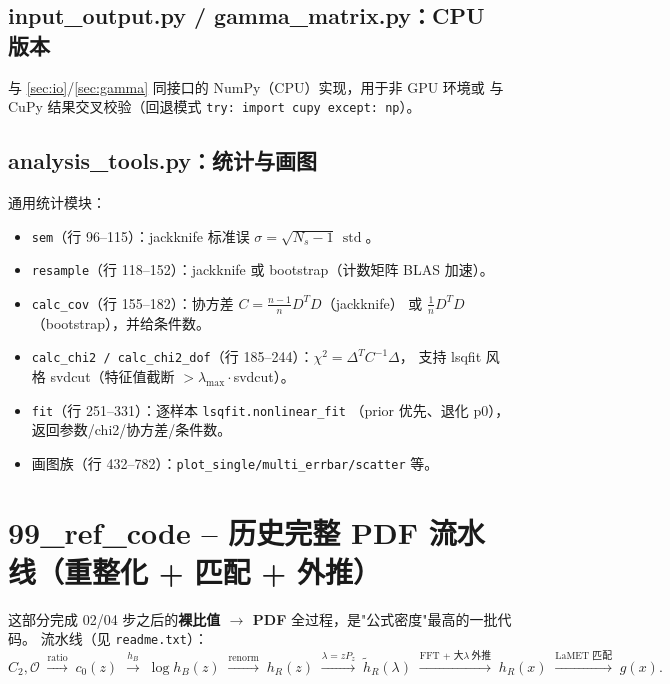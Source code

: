 \documentclass[UTF8,11pt]{ctexart}
\begin{document}
\subsection{input\_output.py / gamma\_matrix.py：CPU 版本}
\label{sec:io_cpu}

与 \ref{sec:io}/\ref{sec:gamma} 同接口的 NumPy（CPU）实现，用于非 GPU 环境或
与 CuPy 结果交叉校验（回退模式 \texttt{try: import cupy except: np}）。

\subsection{analysis\_tools.py：统计与画图}
\label{sec:analysis_tools}

通用统计模块：
\begin{itemize}
  \item \texttt{sem}（行 96--115）：jackknife 标准误 $\sigma=\sqrt{N_s-1}\,\operatorname{std}$。
  \item \texttt{resample}（行 118--152）：jackknife 或 bootstrap（计数矩阵 BLAS 加速）。
  \item \texttt{calc\_cov}（行 155--182）：协方差 $C=\frac{n-1}{n}D^T D$（jackknife）
  或 $\frac1n D^T D$（bootstrap），并给条件数。
  \item \texttt{calc\_chi2 / calc\_chi2\_dof}（行 185--244）：$\chi^2=\Delta^T C^{-1}\Delta$，
  支持 lsqfit 风格 svdcut（特征值截断 $> \lambda_{\max}\cdot$svdcut）。
  \item \texttt{fit}（行 251--331）：逐样本 \texttt{lsqfit.nonlinear\_fit}
  （prior 优先、退化 p0），返回参数/chi2/协方差/条件数。
  \item 画图族（行 432--782）：\texttt{plot\_single/multi\_errbar/scatter} 等。
\end{itemize}

\section{99\_ref\_code -- 历史完整 PDF 流水线（重整化 + 匹配 + 外推）}
\label{sec:ref}

这部分完成 02/04 步之后的\textbf{裸比值 $\to$ PDF} 全过程，是"公式密度"最高的一批代码。
流水线（见 \texttt{readme.txt}）：
\begin{equation}
  C_2,\mathcal O \;\xrightarrow{\text{ratio}}\; c_0(z)
  \;\xrightarrow{h_B}\;\log h_B(z)
  \;\xrightarrow{\text{renorm}}\; h_R(z)
  \;\xrightarrow{\lambda=zP_z}\;\tilde h_R(\lambda)
  \;\xrightarrow{\text{FFT + 大}\lambda\ \text{外推}}\; h_R(x)
  \;\xrightarrow{\text{LaMET 匹配}}\; g(x).
\end{equation}
\end{document}
